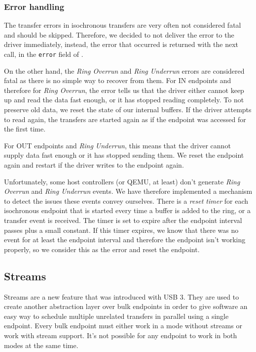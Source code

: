 \subsubsection{Error handling}

The transfer errors in isochronous transfers are very often not considered fatal
and should be skipped. Therefore, we decided to not deliver the
error to the driver immediately, instead, the error that occurred is returned with
the next  call, in the \texttt{error} field of
.

On the other hand, the \textit{Ring Overrun} and \textit{Ring Underrun} errors
are considered fatal as there is no simple way to recover from them. For IN
endpoints and therefore for \textit{Ring Overrun}, the error tells us that the
driver either cannot keep up and read the data fast enough, or it has stopped
reading completely. To not preserve old data, we reset the state of our
internal buffers. If the driver attempts to read again, the transfers are
started again as if the endpoint was accessed for the first time.

For OUT endpoints and \textit{Ring Underrun}, this means that the driver cannot
supply data fast enough or it has stopped sending them. We reset the endpoint
again and restart if the driver writes to the endpoint again.

Unfortunately, some host controllers (or QEMU, at least) don't generate
\textit{Ring Overrun} and \textit{Ring Underrun} events. We have therefore
implemented a mechanism to detect the issues these events convey ourselves.
There is a \textit{reset timer} for each isochronous endpoint that is started
every time a buffer is added to the ring, or a transfer event is received. The
timer is set to expire after the endpoint interval passes plus a small
constant. If this timer expires, we know that there was no event for at least
the endpoint interval and therefore the endpoint isn't working properly, so we
consider this as the error and reset the endpoint.

\subsection{Streams}

Streams are a new feature that was introduced with USB 3. They are used to
create another abstraction layer over bulk endpoints in order to give software
an easy way to schedule multiple unrelated transfers in parallel using a single
endpoint. Every bulk endpoint must either work in a mode without streams or
work with stream support. It's not possible for any endpoint to work in both
modes at the same time.

